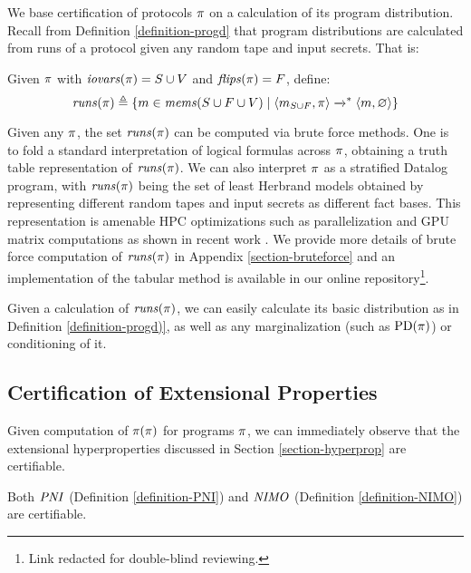 We base certification of protocols $\pi$ on a calculation of its
program distribution. Recall from Definition \ref{definition-progd} that
program distributions are calculated from runs of a protocol given
any random tape and input secrets. That is:
\begin{definition}
  Given $\pi$ with $\mathit{iovars}(\pi) = S \cup V$ and $\mathit{flips}(\pi) = F$, define:
  $$
  \mathit{runs}(\pi) \triangleq \{ m \in \mathit{mems}(S\cup F \cup V) \mid \langle m_{S \cup F},\pi \rangle \xrightarrow{}^{*} \langle m,\varnothing \rangle \}
  $$
\end{definition}

Given any $\pi$, the set $\mathit{runs}(\pi)$ can be computed via brute
force methods. One is to fold a standard interpretation of logical
formulas across $\pi$, obtaining a truth table representation of
$\mathit{runs}(\pi)$. We can also interpret $\pi$ as a stratified Datalog
program, with $\mathit{runs}(\pi)$ being the set of least Herbrand models
obtained by representing different random tapes and input secrets as
different fact bases. This representation is amenable HPC
optimizations such as parallelization and GPU matrix computations as
shown in recent work
\cite{sakama2017linear,aspis2018linear,nguyen2022enhancing,nguyen2021efficient}.
We provide more details of brute force computation of $\mathit{runs}(\pi)$ in
Appendix \ref{section-bruteforce} and an implementation of
the tabular method is available in our online repository\footnote{Link
redacted for double-blind reviewing.}.

Given a calculation of $\mathit{runs}(\pi)$, we can easily calculate its
basic distribution as in Definition \ref{definition-progd)}, as well
as any marginalization (such as $\mathrm{PD}(\pi)$) or conditioning of it.

\subsection{Certification of Extensional Properties}

Given computation of $\pi(\pi)$ for programs $\pi$, we can
immediately observe that the extensional hyperproperties discussed in
Section \ref{section-hyperprop} are certifiable.
\begin{lemma}
  Both $\mathit{PNI}$ (Definition \ref{definition-PNI}) and $\mathit{NIMO}$ (Definition \ref{definition-NIMO}) are certifiable. 
\end{lemma}

